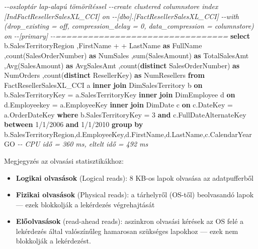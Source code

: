 \documentclass[
  magyar,
]{article}
\newenvironment{Shaded}{}{}
\newcommand{\CommentTok}[1]{\textcolor[rgb]{0.38,0.63,0.69}{\textit{#1}}}
\newcommand{\DecValTok}[1]{\textcolor[rgb]{0.25,0.63,0.44}{#1}}
\newcommand{\FunctionTok}[1]{\textcolor[rgb]{0.02,0.16,0.49}{#1}}
\newcommand{\KeywordTok}[1]{\textcolor[rgb]{0.00,0.44,0.13}{\textbf{#1}}}
\newcommand{\NormalTok}[1]{#1}
\newcommand{\OperatorTok}[1]{\textcolor[rgb]{0.40,0.40,0.40}{#1}}
\newcommand{\StringTok}[1]{\textcolor[rgb]{0.25,0.44,0.63}{#1}}
\providecommand{\tightlist}{%
  \setlength{\itemsep}{0pt}\setlength{\parskip}{0pt}}
\begin{document}
\begin{Shaded}
\begin{Highlighting}[]
\CommentTok{{-}{-}oszloptár lap{-}alapú tömörítéssel}
\CommentTok{{-}{-}create clustered columnstore index [IndFactResellerSalesXL\_CCI] on}
\CommentTok{{-}{-}[dbo].[FactResellerSalesXL\_CCI]}
\CommentTok{{-}{-}with (drop\_existing = off, compression\_delay = 0, data\_compression = columnstore) on}
\CommentTok{{-}{-}[primary]}
\CommentTok{{-}{-}================================}
\KeywordTok{select}\NormalTok{ b.SalesTerritoryRegion}
\NormalTok{  ,FirstName }\OperatorTok{+} \StringTok{\textquotesingle{} \textquotesingle{}} \OperatorTok{+}\NormalTok{ LastName }\KeywordTok{as}\NormalTok{ FullName}
\NormalTok{  ,}\FunctionTok{count}\NormalTok{(SalesOrderNumber) }\KeywordTok{as}\NormalTok{ NumSales}
\NormalTok{  ,}\FunctionTok{sum}\NormalTok{(SalesAmount) }\KeywordTok{as}\NormalTok{ TotalSalesAmt}
\NormalTok{  ,}\FunctionTok{Avg}\NormalTok{(SalesAmount) }\KeywordTok{as}\NormalTok{ AvgSalesAmt}
\NormalTok{  ,}\FunctionTok{count}\NormalTok{(}\KeywordTok{distinct}\NormalTok{ SalesOrderNumber) }\KeywordTok{as}\NormalTok{ NumOrders}
\NormalTok{  ,}\FunctionTok{count}\NormalTok{(}\KeywordTok{distinct}\NormalTok{ ResellerKey) }\KeywordTok{as}\NormalTok{ NumResellers}
\KeywordTok{from}\NormalTok{ FactResellerSalesXL\_CCI a}
\KeywordTok{inner} \KeywordTok{join}\NormalTok{ DimSalesTerritory b }\KeywordTok{on}\NormalTok{ b.SalesTerritoryKey }\OperatorTok{=}\NormalTok{ a.SalesTerritoryKey}
\KeywordTok{inner} \KeywordTok{join}\NormalTok{ DimEmployee d }\KeywordTok{on}\NormalTok{ d.Employeekey }\OperatorTok{=}\NormalTok{ a.EmployeeKey}
\KeywordTok{inner} \KeywordTok{join}\NormalTok{ DimDate c }\KeywordTok{on}\NormalTok{ c.DateKey }\OperatorTok{=}\NormalTok{ a.OrderDateKey}
\KeywordTok{where}\NormalTok{ b.SalesTerritoryKey }\OperatorTok{=} \DecValTok{3}
  \KeywordTok{and}\NormalTok{ c.FullDateAlternateKey }\KeywordTok{between} \StringTok{\textquotesingle{}1/1/2006\textquotesingle{}} \KeywordTok{and} \StringTok{\textquotesingle{}1/1/2010\textquotesingle{}}
\KeywordTok{group} \KeywordTok{by}\NormalTok{ b.SalesTerritoryRegion,d.EmployeeKey,d.FirstName,d.LastName,c.CalendarYear}
\NormalTok{GO  }\CommentTok{{-}{-} CPU idő = 360 ms, eltelt idő = 492 ms}
\end{Highlighting}
\end{Shaded}

Megjegyzés az olvasási statisztikákhoz:

\begin{itemize}
\tightlist
\item
  \textbf{Logikai olvasások} (Logical reads): 8 KB-os lapok olvasása az
  adatpufferből
\item
  \textbf{Fizikai olvasások} (Physical reads): a tárhelyről (OS-től)
  beolvasandó lapok --- ezek blokkolják a lekérdezés végrehajtását
\item
  \textbf{Előolvasások} (read-ahead reads): aszinkron olvasási kérések
  az OS felé a lekérdezés által valószínűleg hamarosan szükséges
  lapokhoz --- ezek nem blokkolják a lekérdezést.
\end{itemize}
\end{document}
